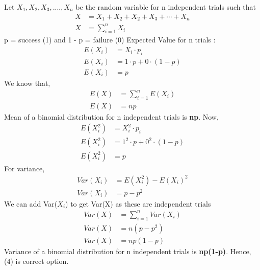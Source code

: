 Let $X_1,X_2,X_3,....,X_n$ be the random variable for n independent trials such that 
\begin{align}
X &= X_1 + X_2 + X_2 + X_3 + \cdots + X_n \nonumber \\ 
X &= \sum_{i=1}^n X_i \nonumber 
\end{align}
p = success (1) and 1 - p = failure (0) 
Expected Value for n trials : 
\begin{align}
E(X_i) &= X_i\cdot p_i \nonumber\\
E(X_i) &= 1\cdot p + 0\cdot (1-p)\nonumber\\
E(X_i) &= p
\end{align}
We know that,
\begin{align}
E(X) &= \sum_{i=1}^n E (X_i) \nonumber\\
E(X) &= np
 \end{align}
Mean of a binomial distribution for n independent trials is \textbf{np}.
Now,
\begin{align}
E(X_i^2) &= X_i^2\cdot p_i \nonumber\\
E(X_i^2) &= 1^2\cdot p + 0^2\cdot (1-p)\nonumber\\
E(X_i^2) &= p
\end{align}
For variance,
\begin{align}
    Var(X_i) &= E(X_i^2) - E(X_i)^2 \nonumber\\
    Var(X_i) &= p - p^2 
    \end{align}
We can add Var($X_i$)  to get Var(X)  as these are independent trials
\begin{align}
Var(X) &= \sum_{i=1}^n Var(X_i) \nonumber \\
Var(X) &= n(p - p^2)\nonumber\\
Var(X) &= np(1-p)
\end{align}
Variance of a binomial distribution for n independent trials is \textbf{np(1-p)}.
Hence, (4) is correct option.
